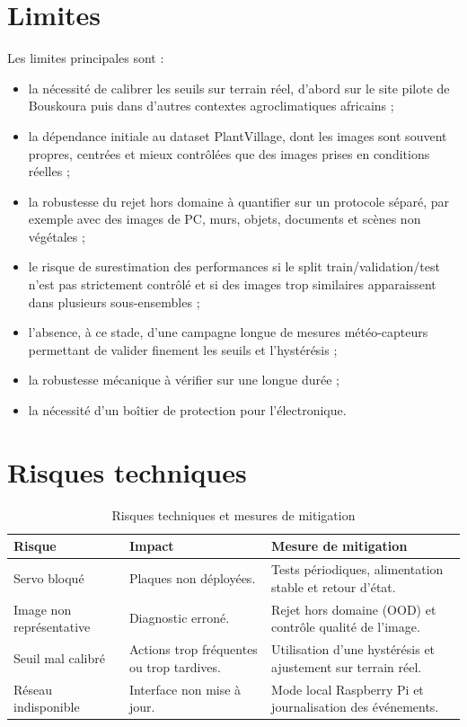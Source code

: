 ﻿\documentclass[11pt,a4paper,openany]{report}
\begin{document}
\section{Limites}
Les limites principales sont :
\begin{itemize}
  \item la nécessité de calibrer les seuils sur terrain réel, d'abord sur le site pilote de Bouskoura puis dans d'autres contextes agroclimatiques africains ;
  \item la dépendance initiale au dataset PlantVillage, dont les images sont souvent propres, centrées et mieux contrôlées que des images prises en conditions réelles ;
  \item la robustesse du rejet hors domaine à quantifier sur un protocole séparé, par exemple avec des images de PC, murs, objets, documents et scènes non végétales ;
  \item le risque de surestimation des performances si le split train/validation/test n'est pas strictement contrôlé et si des images trop similaires apparaissent dans plusieurs sous-ensembles ;
  \item l'absence, à ce stade, d'une campagne longue de mesures météo-capteurs permettant de valider finement les seuils et l'hystérésis ;
  \item la robustesse mécanique à vérifier sur une longue durée ;
  \item la nécessité d'un boîtier de protection pour l'électronique.
\end{itemize}

\section{Risques techniques}
\begin{table}[H]
\centering
\renewcommand{\arraystretch}{1.3}

\begin{tabular}{|p{3cm}|p{4cm}|p{6cm}|}
\hline
\textbf{Risque} &
\textbf{Impact} &
\textbf{Mesure de mitigation} \\
\hline

Servo bloqué &
Plaques non déployées. &
Tests périodiques, alimentation stable et retour d'état. \\
\hline

Image non représentative &
Diagnostic erroné. &
Rejet hors domaine (OOD) et contrôle qualité de l'image. \\
\hline

Seuil mal calibré &
Actions trop fréquentes ou trop tardives. &
Utilisation d'une hystérésis et ajustement sur terrain réel. \\
\hline

Réseau indisponible &
Interface non mise à jour. &
Mode local Raspberry Pi et journalisation des événements. \\
\hline

\end{tabular}

\caption{Risques techniques et mesures de mitigation}
\label{tab:risques}
\end{table}
\end{document}
